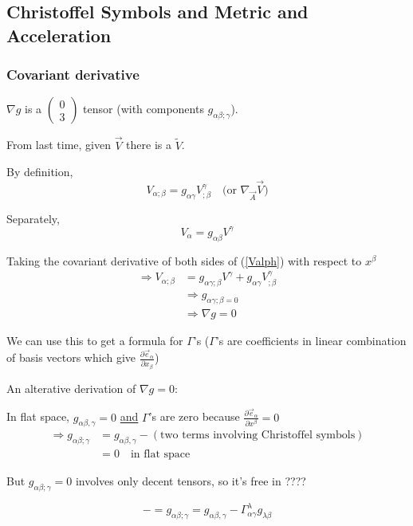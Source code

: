 \documentclass[a4paper]{article} %
\newcommand{\pmx}[1]{
\begin{pmatrix}
#1
\end{pmatrix}
}
\renewcommand{\tilde}{\widetilde}
\begin{document}
\subsection{Christoffel Symbols and Metric and Acceleration}
\subsubsection{Covariant derivative}
$\nabla g$ is a $\pmx{0\\3}$ tensor (with components $g_{\alpha\beta ; \gamma}$).

From last time, given $\vec{V}$ there is a $\tilde{V}$.

By definition,
\begin{equation}
V_{\alpha;\beta}=g_{\alpha\gamma} V^{\gamma}_{;\beta}\quad\text{(or $\nabla_{\vec{A}}\vec{V}$)}\label{product rule}
\end{equation}

Separately,
\begin{equation}
V_{\alpha}=g_{\alpha\beta}V^{\gamma}\label{Valph}
\end{equation}

Taking the covariant derivative of both sides of (\ref{Valph}) with respect to $x^{\beta}$
\begin{align}
\Rightarrow V_{\alpha;\beta}&=g_{\alpha\gamma;\beta}V^{\gamma}+g_{\alpha\gamma}V^{\gamma}_{;\beta}\\
&\Rightarrow g_{\alpha\gamma;\beta=0}\\
&\Rightarrow \nabla g=0
\end{align}

We can use this to get a formula for $\Gamma$'s ($\Gamma$'s are coefficients in linear combination of basis vectors which give $\frac{\partial \vec{e}_{\alpha}}{\partial x_{\beta}}$)

An alterative derivation of $\nabla g=0$:

In flat space, $g_{\alpha\beta , \gamma}=0$ \underline{and} $\Gamma$'s are zero because $\frac{\partial\vec{e}_{\alpha}}{\partial x^{\beta}}=0$
\begin{align}
\Rightarrow g_{\alpha\beta;\gamma}&=g_{\alpha\beta,\gamma}-(\text{two terms involving Christoffel symbols})\\
&=0 \quad\text{in flat space}
\end{align}

But $g_{\alpha\beta;\gamma}=0$ involves only decent tensors, so it's free in ????

\begin{equation}
-=g_{\alpha\beta;\gamma}=g_{\alpha\beta,\gamma}-\Gamma^{\lambda}_{\alpha\gamma}g_{\lambda\beta}
\end{equation}
\end{document}
